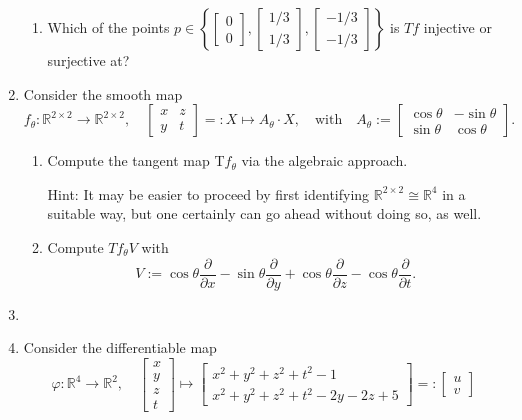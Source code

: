 \documentclass{article}
\begin{document}
\begin{enumerate}[start=19]
\begin{enumerate}
    \item Which of the points
    $p\in\left\{\begin{bmatrix}0\\0\end{bmatrix}, \begin{bmatrix}1/3\\1/3\end{bmatrix}, \begin{bmatrix}-1/3\\-1/3\end{bmatrix}\right\}$
    is $Tf$ injective or surjective at?
  \end{enumerate}

  \item Consider the smooth map
  $$
  f_{\theta}:\mathbb{R}^{2\times2}\rightarrow\mathbb{R}^{2\times2},\quad
  \begin{bmatrix}x&z\\y&t\end{bmatrix}=:X\mapsto A_{\theta}\cdot X,\quad\text{with}\quad A_{\theta}:=
  \begin{bmatrix}\cos\theta&-\sin\theta\\\sin\theta&\cos\theta\end{bmatrix}.
  $$

  \begin{enumerate}
    \item Compute the tangent map T$f_{\theta}$ via the algebraic approach.

    {\footnotesize Hint: It may be easier to proceed by first identifying $\mathbb{R}^{2\times2}\cong\mathbb{R}^{4}$ in a suitable way, but one certainly can go ahead without doing so, as well.}

    \item Compute $Tf_{\theta}V$ with
    $$
    V:=\cos\theta\frac{\partial}{\partial x}-\sin\theta\frac{\partial}{\partial y}+
    \cos\theta\frac{\partial}{\partial z}-\cos\theta\frac{\partial}{\partial t}.
    $$
  \end{enumerate}

  \item

  \item Consider the differentiable map
  $$
  \varphi:\mathbb{R}^{4}\rightarrow\mathbb{R}^{2},\quad
  \begin{bmatrix}x\\y\\z\\t\end{bmatrix}\mapsto
  \begin{bmatrix}x^{2}+y^{2}+z^{2}+t^{2}-1\\x^{2}+y^{2}+z^{2}+t^{2}-2y-2z+5\end{bmatrix}=:
  \begin{bmatrix}u\\v\end{bmatrix}
  $$


\end{enumerate}
\end{document}
